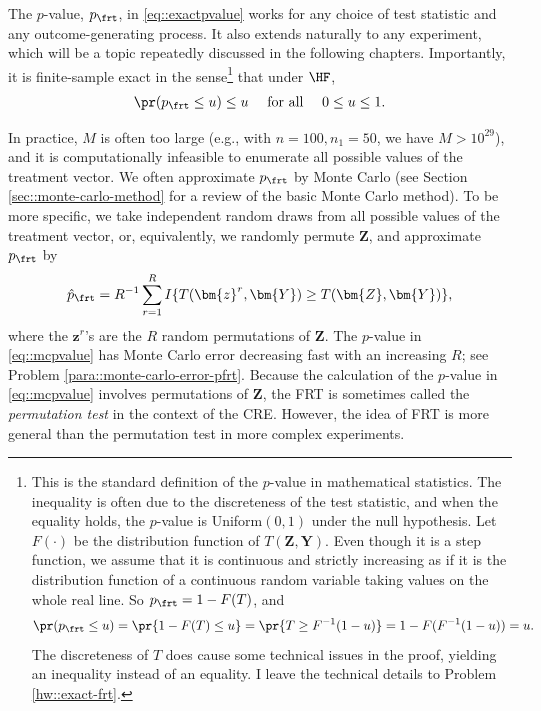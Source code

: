 The $p$-value, $p_\frt$,  in \eqref{eq::exactpvalue} works for any choice of test statistic and any outcome-generating process. It also extends naturally to any experiment, which will be a topic repeatedly discussed in the following chapters. Importantly, it is finite-sample exact in the sense\footnote{This is the standard definition of the $p$-value in mathematical statistics. The inequality is often due to the discreteness of the test statistic, and when the equality holds, the $p$-value is Uniform$(0,1)$ under the null hypothesis. Let $F(\cdot)$ be the distribution function of $T(\bm{Z},\bm{Y})$. Even though it is a step function, we assume that it is continuous and strictly increasing as if it is the distribution function of a continuous random variable taking values on the whole real line.  So $p_\frt = 1- F(T)$, and  
$$
\pr(p_\frt \leq u) = \pr\{ 1-F(T) \leq u\} = \pr\{  T \geq F^{-1}(1-u)  \} = 1- F( F^{-1}(1-u)) = u.
$$
The discreteness of $T$ does cause some technical issues in the proof, yielding an inequality instead of an equality. I leave the technical details to Problem \ref{hw::exact-frt}.}  that under $\HF$,
\begin{eqnarray}\label{eq::p-value-valid}
\pr(p_\frt \leq u) \leq u \quad  \text{ for all } \quad 0 \leq u \leq 1.
\end{eqnarray}




In practice, $M$ is often too large (e.g., with $n=100, n_1=50$, we have $M > 10^{29}$), and it is computationally infeasible to enumerate all possible values of the treatment vector. We often approximate $p_\frt$ by Monte Carlo (see Section \ref{sec::monte-carlo-method} for a review of the basic Monte Carlo method). To be more specific, we take independent random draws from all possible values of the treatment vector, or, equivalently, we randomly permute $\bm{Z}$, and approximate $p_\frt$ by
\begin{equation}\label{eq::mcpvalue}
\hat p_\frt  =  R^{-1} \sum_{r=1}^R   I\{ T(\bm{z}^r,\bm{Y})   \geq T(\bm{Z},\bm{Y})   \},
\end{equation}
where the $\bm{z}^r$'s are the $R$ random permutations of $\bm{Z}$.
The $p$-value in \eqref{eq::mcpvalue} has Monte Carlo error decreasing fast with an increasing $R$; see Problem \ref{para::monte-carlo-error-pfrt}. Because the calculation of the $p$-value in \eqref{eq::mcpvalue} involves permutations of $\bm{Z}$, the FRT is sometimes called the {\it permutation test} in the context of the CRE. However, the idea of FRT is more general than the permutation test in more complex experiments. 



